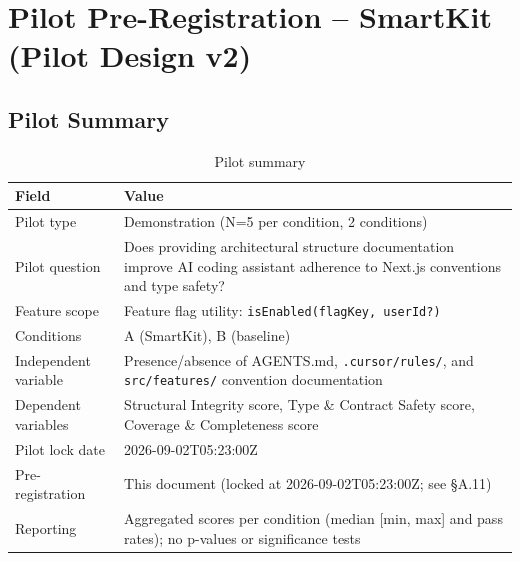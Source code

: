 
\chapter{Pilot Pre-Registration -- SmartKit (Pilot Design v2)}
\label{app:pre-registration}


\section{Pilot Summary}

\begin{table}[H]
\centering
\begin{tabular}{lp{9cm}}
\toprule
\textbf{Field} & \textbf{Value} \\
\midrule
Pilot type & Demonstration (N=5 per condition, 2 conditions) \\
Pilot question & Does providing architectural structure documentation improve AI coding assistant adherence to Next.js conventions and type safety? \\
Feature scope & Feature flag utility: \texttt{isEnabled(flagKey, userId?)} \\
Conditions & A (SmartKit), B (baseline) \\
Independent variable & Presence/absence of AGENTS.md, \texttt{.cursor/rules/}, and \texttt{src/features/} convention documentation \\
Dependent variables & Structural Integrity score, Type \& Contract Safety score, Coverage \& Completeness score \\
Pilot lock date & 2026-09-02T05:23:00Z \\
Pre-registration & This document (locked at 2026-09-02T05:23:00Z; see \S A.11) \\
Reporting & Aggregated scores per condition (median [min, max] and pass rates); no p-values or significance tests \\
\bottomrule
\end{tabular}
\caption{Pilot summary}
\label{tab:pilot-summary}
\end{table}



